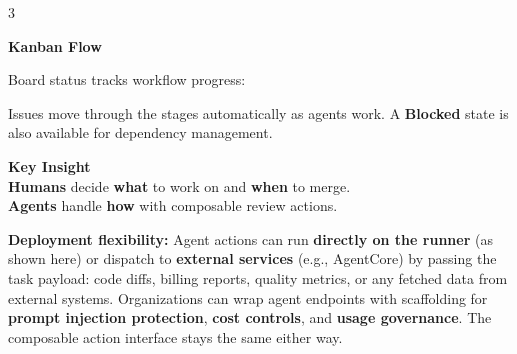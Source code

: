 \documentclass[11pt,letterpaper]{article}
\begin{document}
\begin{multicols}{3}
\columnbreak

\textcolor{kanban}{\Large\textbf{Kanban Flow}}
\vspace{0.3em}

Board status tracks workflow progress:

\vspace{0.5em}
\begin{center}
\end{center}

\vspace{0.4em}
{\small Issues move through the stages automatically as agents work. A \textbf{Blocked} state is also available for dependency management.}

\vspace{0.5em}

\begin{tcolorbox}[colback=darktext!8, colframe=darktext!40, boxrule=0.8pt, arc=3pt, left=6pt, right=6pt, top=6pt, bottom=6pt]
\textbf{\large Key Insight}\\[0.3em]
\textcolor{humangate}{\textbf{Humans}} decide \textbf{what} to work on and \textbf{when} to merge.\\[0.3em]
\textcolor{agentwork}{\textbf{Agents}} handle \textbf{how} with composable review actions.
\end{tcolorbox}

\end{multicols}

\vspace{0.4em}
\begin{tcolorbox}[colback=agentwork!5, colframe=agentwork!30, boxrule=0.6pt, arc=3pt, left=8pt, right=8pt, top=4pt, bottom=4pt]
{\small\textbf{Deployment flexibility:} Agent actions can run \textbf{directly on the runner} (as shown here) or dispatch to \textbf{external services} (e.g., AgentCore) by passing the task payload: code diffs, billing reports, quality metrics, or any fetched data from external systems. Organizations can wrap agent endpoints with scaffolding for \textbf{prompt injection protection}, \textbf{cost controls}, and \textbf{usage governance}. The composable action interface stays the same either way.}
\end{tcolorbox}
\end{document}
